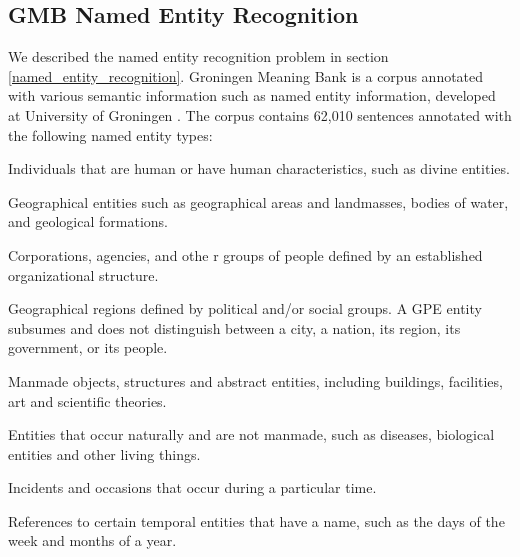 \subsection{GMB Named Entity Recognition}
We described the named entity recognition problem in section \ref{named_entity_recognition}. Groningen Meaning Bank is a corpus annotated with various semantic information such as named entity information, developed at University of Groningen \citep{basile2012}. The corpus contains 62,010 sentences annotated with the following named entity types:

\begin{description}[labelindent=4em, leftmargin=4em]
	\item [Person] Individuals that are human or have human characteristics, such as divine entities.
	\item [Location]  Geographical entities such as geographical areas and landmasses, bodies of water, and geological formations.
	\item [Organization] Corporations, agencies, and othe	r groups of people defined by an established organizational structure.
	\item [Geo-Political Entity] Geographical regions defined by political and/or social groups. A GPE entity subsumes and does not distinguish between a city, a nation, its region, its government, or its people.
	\item [Artifact] Manmade objects, structures and abstract entities, including buildings, facilities, art and scientific theories.
	\item [Natural Object] Entities that occur naturally and are not manmade, such as diseases, biological entities and other living things.
	\item [Event] Incidents and occasions that occur during a particular time.
	\item [Time] References to certain temporal entities that have a name, such as the days of the week and months of a year.
\end{description}		